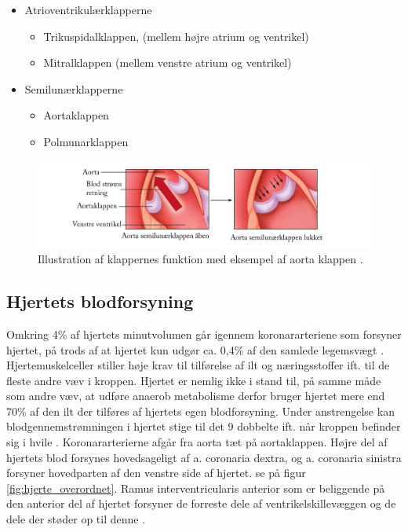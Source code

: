 \begin{itemize} 
	\item Atrioventrikulærklapperne
		\begin{itemize} 

			\item Trikuspidalklappen, (mellem højre atrium og ventrikel)
			\item Mitralklappen (mellem venstre atrium og ventrikel)

		\end{itemize} 

	\item Semilunærklapperne
		\begin{itemize} 

			\item Aortaklappen
			\item Polmunarklappen

		\end{itemize} 		
\end{itemize} 


\begin{figure}[H] %
\begin{center}
\includegraphics[width=1\textwidth]{figures/cusp}
\end{center}
\caption{Illustration af klappernes funktion med eksempel af aorta klappen \cite{cindy}.}
\label{fig:hjerte_klap}
\end{figure}

\subsection{Hjertets blodforsyning}
Omkring 4\% af hjertets minutvolumen går igennem koronararteriene som forsyner hjertet, på trods af at hjertet kun udgør ca. 0,4\% af den samlede legemsvægt \cite{gronanatomi}. Hjertemuskelceller stiller høje krav til tilførelse af ilt og næringsstoffer ift. til de fleste andre væv i kroppen. Hjertet er nemlig ikke i stand til, på samme måde som andre væv, at udføre anaerob metabolisme derfor bruger hjertet mere end 70\% af den ilt der tilføres af hjertets egen blodforsyning. Under anstrengelse kan blodgennemstrømningen i hjertet stige til det 9 dobbelte ift. når kroppen befinder sig i hvile \cite{martini}. Koronararterierne afgår fra aorta tæt på aortaklappen. Højre del af hjertets blod forsynes hovedsageligt af a. coronaria dextra, og a. coronaria sinistra forsyner hovedparten af den venstre side af hjertet. se på figur \ref{fig:hjerte_overordnet}. Ramus interventricularis anterior som er beliggende på den anterior del af hjertet forsyner de forreste dele af ventrikelskillevæggen og de dele der støder op til denne \cite{gronanatomi}.

